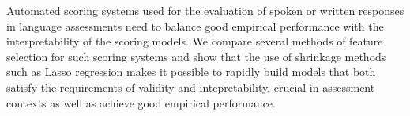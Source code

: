 Automated scoring systems used for the evaluation of spoken or written responses in language assessments need to balance good empirical performance with the interpretability of the scoring models. We compare several methods of feature selection for such scoring systems and show that the use of shrinkage methods such as Lasso regression makes it possible to rapidly build models that both satisfy the requirements of validity and intepretability, crucial in assessment contexts as well as achieve good empirical performance.
